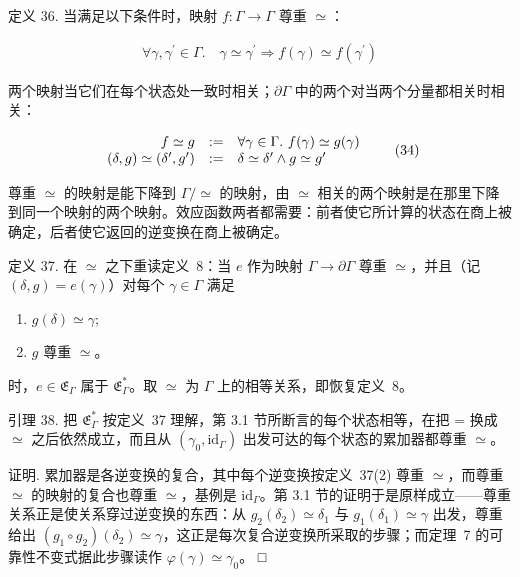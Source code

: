 \documentclass[
  10
]{article}
\providecommand{\tightlist}{%
  \setlength{\itemsep}{0pt}\setlength{\parskip}{0pt}}
\begin{document}
定义 36. 当满足以下条件时，映射 \(f : \Gamma \to \Gamma\) 尊重 $\simeq$：

\[
\begin{array} { r } { \forall \gamma , \gamma ^ { \prime } \in \Gamma . \quad \gamma \simeq \gamma ^ { \prime } \Rightarrow f ( \gamma ) \simeq f ( \gamma ^ { \prime } ) } \end{array}\tag{33}
\]

两个映射当它们在每个状态处一致时相关；\(\partial \Gamma\) 中的两个对当两个分量都相关时相关：

\[
\begin{array} { r c l } { f \simeq g } & { : = } & { \forall \gamma \in \Gamma . \ f ( \gamma ) \simeq g ( \gamma ) } \\ { ( \delta , g ) \simeq ( \delta ^ { \prime } , g ^ { \prime } ) } & { : = } & { \delta \simeq \delta ^ { \prime } \wedge g \simeq g ^ { \prime } } \end{array}\tag{34}
\]

尊重 $\simeq$ 的映射是能下降到 \(\Gamma / \simeq\) 的映射，由 $\simeq$ 相关的两个映射是在那里下降到同一个映射的两个映射。效应函数两者都需要：前者使它所计算的状态在商上被确定，后者使它返回的逆变换在商上被确定。

定义 37. 在 $\simeq$ 之下重读定义~8：当 \(e\) 作为映射 \(\Gamma \to \partial \Gamma\) 尊重 $\simeq$，并且（记 \(( \delta , g ) = e ( \gamma )\)）对每个 \(\gamma \in \Gamma\) 满足

\begin{enumerate}
\def\labelenumi{\arabic{enumi}.}
\tightlist
\item
  \(g ( \delta ) \simeq \gamma ;\)
\item
  \(g\) 尊重 $\simeq$。
\end{enumerate}

时，\(e \in \mathfrak { E } _ { \Gamma }\) 属于 \(\mathfrak { E } _ { \Gamma } ^ { * }\)。取 $\simeq$ 为 \(\Gamma\) 上的相等关系，即恢复定义~8。

引理 38. 把 \(\mathfrak { E } _ { \Gamma } ^ { * }\) 按定义~37 理解，第 3.1 节所断言的每个状态相等，在把 = 换成 \(\simeq\) 之后依然成立，而且从 \(( \gamma _ { 0 } , \mathrm { i d } _ { \Gamma } )\) 出发可达的每个状态的累加器都尊重 \(\simeq\)。

证明. 累加器是各逆变换的复合，其中每个逆变换按定义~37(2) 尊重 $\simeq$，而尊重 $\simeq$ 的映射的复合也尊重 \(\simeq\)，基例是 \(\mathrm { i d } _ { \Gamma }\)。第 3.1 节的证明于是原样成立——尊重关系正是使关系穿过逆变换的东西：从 \(g _ { 2 } ( \delta _ { 2 } ) \simeq \delta _ { 1 }\) 与 \(g _ { 1 } ( \delta _ { 1 } ) \simeq \gamma\) 出发，尊重给出 \(( g _ { 1 } \circ g _ { 2 } ) ( \delta _ { 2 } ) \simeq \gamma\)，这正是每次复合逆变换所采取的步骤；而定理~7 的可靠性不变式据此步骤读作 \(\varphi ( \gamma ) \simeq \gamma _ { 0 }\)。 □
\end{document}
